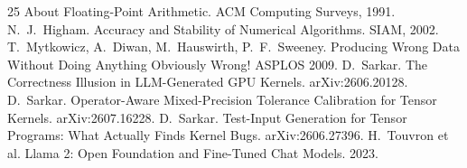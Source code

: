 \documentclass[twocolumn,10pt]{article}
\begin{document}
\begin{thebibliography}{25}
About Floating-Point Arithmetic. ACM Computing Surveys, 1991.
 N.~J.~Higham. Accuracy and Stability of Numerical
Algorithms. SIAM, 2002.
 T.~Mytkowicz, A.~Diwan, M.~Hauswirth, P.~F.~Sweeney.
Producing Wrong Data Without Doing Anything Obviously Wrong! ASPLOS 2009.
 D.~Sarkar. The Correctness Illusion in LLM-Generated
GPU Kernels. arXiv:2606.20128.
 D.~Sarkar. Operator-Aware Mixed-Precision Tolerance
Calibration for Tensor Kernels. arXiv:2607.16228.
 D.~Sarkar. Test-Input Generation for Tensor Programs:
What Actually Finds Kernel Bugs. arXiv:2606.27396.
 H.~Touvron et al. Llama 2: Open Foundation and Fine-Tuned
Chat Models. 2023.
\end{thebibliography}
\end{document}
